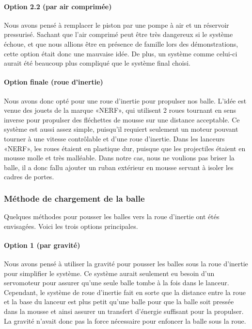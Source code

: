 \paragraph{Option 2.2 (par air comprimée)}
Nous avons pensé à remplacer le piston par une pompe à air et un réservoir pressurisé.
Sachant que l’air comprimé peut être très dangereux si le système échoue, et que nous allions être en présence de famille lors des démonstrations, cette option était donc une mauvaise idée.
De plus, un système comme celui-ci aurait été beaucoup plus compliqué que le système final choisi.

\paragraph{Option finale (roue d’inertie)}
Nous avons donc opté pour une roue d’inertie pour propulser nos balle.
L’idée est venue des jouets de la marque «NERF», qui utilisent 2 roues tournant en sens inverse pour propulser des fléchettes de mousse sur une distance acceptable.
Ce système est aussi assez simple, puisqu’il requiert seulement un moteur pouvant tourner à une vitesse contrôlable et d’une roue d’inertie.
Dans les lanceurs «NERF», les roues étaient en plastique dur, puisque que les projectiles étaient en mousse molle et très malléable.
Dans notre cas, nous ne voulions pas briser la balle, il a donc fallu ajouter un ruban extérieur en mousse servant à isoler les cadres de portes.


\subsubsection{Méthode de chargement de la balle}
Quelques méthodes pour pousser les balles vers la roue d’inertie ont étés envisagées.
Voici les trois options principales.

\paragraph{Option 1 (par gravité)}
Nous avons pensé à utiliser la gravité pour pousser les balles sous la roue d’inertie pour simplifier le système.
Ce système aurait seulement eu besoin d’un servomoteur pour assurer qu’une seule balle tombe à la fois dans le lanceur.
Cependant, le système de roue d’inertie fait en sorte que la distance entre la roue et la base du lanceur est plus petit qu’une balle pour que la balle soit pressée dans la mousse et ainsi assurer un transfert d’énergie suffisant pour la propulser.
La gravité n’avait donc pas la force nécessaire pour enfoncer la balle sous la roue.

